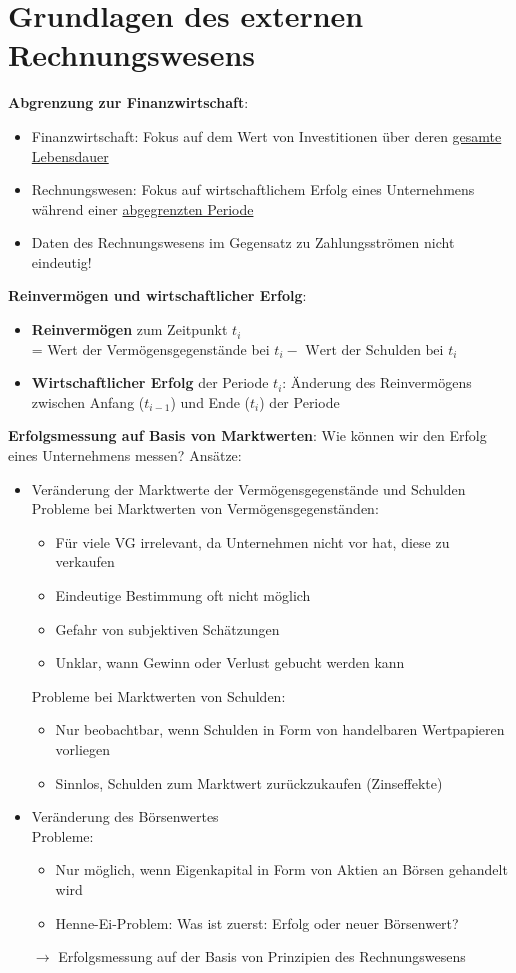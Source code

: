 \section{Grundlagen des externen Rechnungswesens}

\textbf{Abgrenzung zur Finanzwirtschaft}:
\begin{itemize}
	\item Finanzwirtschaft: Fokus auf dem Wert von Investitionen über deren \underline{gesamte Lebensdauer}
	\item Rechnungswesen: Fokus auf wirtschaftlichem Erfolg eines Unternehmens während einer \underline{abgegrenzten Periode}
	\item Daten des Rechnungswesens im Gegensatz zu Zahlungsströmen nicht eindeutig!
\end{itemize}

\textbf{Reinvermögen und wirtschaftlicher Erfolg}:
\begin{itemize}
	\item \textbf{Reinvermögen} zum Zeitpunkt $t_i$ 
	\\= Wert der Vermögensgegenstände bei $t_i - \text{ Wert der Schulden bei } t_i$ 
	\item \textbf{Wirtschaftlicher Erfolg} der Periode $t_i$: Änderung des Reinvermögens zwischen Anfang ($t_{i-1}$) und Ende ($t_i$) der Periode 
\end{itemize}

\textbf{Erfolgsmessung auf Basis von Marktwerten}:
Wie können wir den Erfolg eines Unternehmens messen?
Ansätze:
\begin{itemize}
	\item Veränderung der Marktwerte der Vermögensgegenstände und Schulden\\
	Probleme bei Marktwerten von Vermögensgegenständen:
	\begin{itemize}
		\item Für viele VG irrelevant, da Unternehmen nicht vor hat, diese zu verkaufen
		\item Eindeutige Bestimmung oft nicht möglich
		\item Gefahr von subjektiven Schätzungen
		\item Unklar, wann Gewinn oder Verlust gebucht werden kann
	\end{itemize}
	Probleme bei Marktwerten von Schulden:
	\begin{itemize}
		\item Nur beobachtbar, wenn Schulden in Form von handelbaren Wertpapieren vorliegen
		\item Sinnlos, Schulden zum Marktwert zurückzukaufen (Zinseffekte)
	\end{itemize}
	\item Veränderung des Börsenwertes\\
	Probleme:
	\begin{itemize}
		\item Nur möglich, wenn Eigenkapital in Form von Aktien an Börsen gehandelt wird
		\item Henne-Ei-Problem: Was ist zuerst: Erfolg oder neuer Börsenwert?	
	\end{itemize}
	$\rightarrow$ Erfolgsmessung auf der Basis von Prinzipien des Rechnungswesens
\end{itemize}